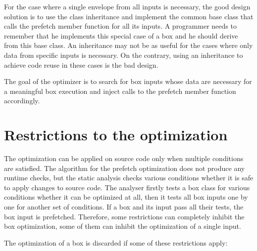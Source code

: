 For the case where a single envelope from all inputs is necessary, the good design solution is to use the class inheritance and implement the common base class that calls the prefetch member function for all its inputs. A programmer needs to remember that he implements this special case of a box and he should derive from this base class. An inheritance may not be as useful for the cases where only data from specific inputs is necessary. On the contrary, using an inheritance to achieve code reuse in these cases is the bad design.

The goal of the optimizer is to search for box inputs whose data are necessary for a meaningful box execution and inject calls to the prefetch member function accordingly.

\section{Restrictions to the optimization}
\label{prefetch-restrictions}
The optimization can be applied on source code only when multiple conditions are satisfied. The algorithm for the prefetch optimization does not produce any runtime checks, but the static analysis checks various conditions whether it is safe to apply changes to source code. The analyser firstly tests a box class for various conditions whether it can be optimized at all, then it tests all box inputs one by one for another set of conditions. If a box and its input pass all their tests, the box input is prefetched. Therefore, some restrictions can completely inhibit the box optimization, some of them can inhibit the optimization of a single input.

The optimization of a box is discarded if some of these restrictions apply:

